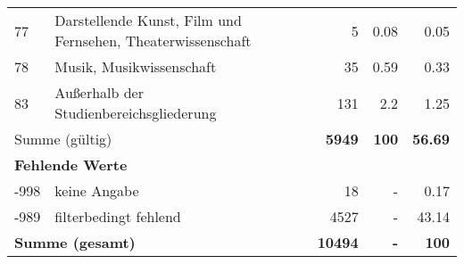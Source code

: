 \begin{longtable}{lXrrr}
        77 & \multicolumn{1}{X}{Darstellende Kunst, Film und Fernsehen, Theaterwissenschaft} & %
          \num{5} &
          \num[round-mode=places,round-precision=2]{0,08} &
          \num[round-mode=places,round-precision=2]{0,05} \\

        78 & \multicolumn{1}{X}{Musik, Musikwissenschaft} & %
          \num{35} &
          \num[round-mode=places,round-precision=2]{0,59} &
          \num[round-mode=places,round-precision=2]{0,33} \\

        83 & \multicolumn{1}{X}{Außerhalb der Studienbereichsgliederung} & %
          \num{131} &
          \num[round-mode=places,round-precision=2]{2,2} &
          \num[round-mode=places,round-precision=2]{1,25} \\

     \midrule
     \multicolumn{2}{l}{Summe (gültig)} &
       \textbf{\num{5949}} &
     \textbf{100} &
       \textbf{\num[round-mode=places,round-precision=2]{56,69}} \\
     \multicolumn{5}{l}{\textbf{Fehlende Werte}}\\
       -998 &
       keine Angabe &
         \num{18} &
        - &
         \num[round-mode=places,round-precision=2]{0,17} \\
       -989 &
       filterbedingt fehlend &
         \num{4527} &
        - &
         \num[round-mode=places,round-precision=2]{43,14} \\
     \midrule
     \multicolumn{2}{l}{\textbf{Summe (gesamt)}} &
          \textbf{\num{10494}} &
        \textbf{-} &
        \textbf{100} \\
     \bottomrule
     \end{longtable}
     
